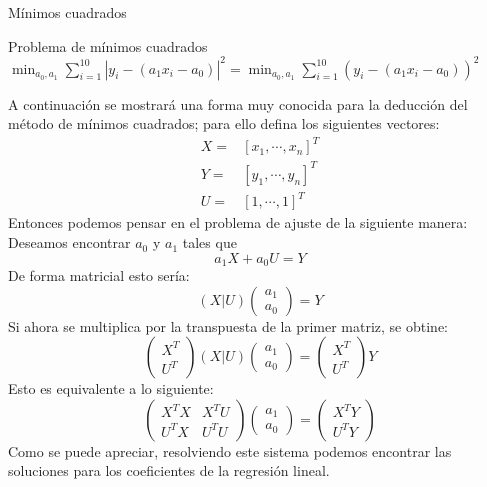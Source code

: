 \begin{frame}[allowframebreaks]{Mínimos cuadrados}
\begin{block}{Problema de mínimos cuadrados}
\centering $\displaystyle \min_{a_0,a_1}\sum_{i=1}^{10}|y_i-(a_1x_i-a_0)|^2=\displaystyle \min_{a_0,a_1}\sum_{i=1}^{10}(y_i-(a_1x_i-a_0))^2$
\end{block}
\indent A continuación se mostrará una forma muy conocida para la deducción del método de mínimos cuadrados; para ello defina los siguientes vectores:
\begin{align*}
X=&[x_1,\cdots,x_n]^T\\
Y=&[y_1,\cdots,y_n]^T\\
U=&[1,\cdots,1]^T
\end{align*}
\indent Entonces podemos pensar en el problema de ajuste de la siguiente manera: Deseamos encontrar $a_0$ y $a_1$ tales que
$$a_1X+a_0U=Y$$
De forma matricial esto sería:
\begin{displaymath}
(X|U)
\left(
\begin{array}{c}
a_1\\
a_0
\end{array}
\right)=Y
\end{displaymath}
\indent Si ahora se multiplica por la transpuesta de la primer matriz, se obtine:
\begin{displaymath}
\left(
\begin{array}{c}
X^T\\
U^T
\end{array}
\right)
(X|U)
\left(
\begin{array}{c}
a_1\\
a_0
\end{array}
\right)=
\left(
\begin{array}{c}
X^T\\
U^T
\end{array}
\right)
Y
\end{displaymath}
\indent Esto es equivalente a lo siguiente:
\begin{displaymath}
\left(
\begin{array}{cc}
X^TX &X^TU\\
U^TX & U^TU
\end{array}
\right)
\left(
\begin{array}{c}
a_1\\
a_0
\end{array}
\right)=
\left(
\begin{array}{c}
X^TY\\
U^TY
\end{array}
\right)
\end{displaymath}
\indent Como se puede apreciar, resolviendo este sistema podemos encontrar las soluciones para los coeficientes de la regresión lineal. \\

\end{frame}
